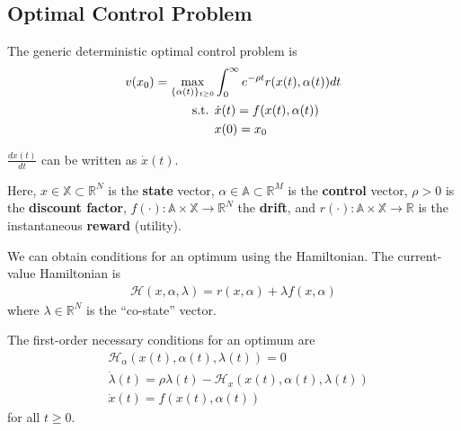 \documentclass[11pt]{elegantbook}
\begin{document}
\subsection{Optimal Control Problem}
\begin{definition}
    The generic deterministic optimal control problem is
    \begin{equation}
        \begin{aligned}
            v(x_0)=\max_{\{\alpha(t)\}_{t\geq 0}}&\int_0^\infty e^{-\rho t}r(x(t),\alpha(t))dt\\
            \textnormal{s.t. }&\dot{x}(t)=f(x(t),\alpha(t))\\
            &x(0)=x_0
        \end{aligned}
        \nonumber
    \end{equation}
    \begin{note}
        $\frac{dx(t)}{dt}$ can be written as $\dot{x}(t)$.
    \end{note}
    Here, $x\in\mathbb{X}\subset \mathbb{R}^N$ is the \textbf{state} vector, $\alpha\in \mathbb{A}\subset \mathbb{R}^M$ is the \textbf{control} vector, $\rho>0$ is the \textbf{discount factor}, $f(\cdot):\mathbb{A}\times \mathbb{X} \rightarrow \mathbb{R}^N$ the \textbf{drift}, and $r(\cdot):\mathbb{A}\times \mathbb{X} \rightarrow \mathbb{R}$ is the instantaneous \textbf{reward} (utility).
\end{definition}
We can obtain conditions for an optimum using the Hamiltonian.
The current-value Hamiltonian is
    \begin{equation}
        \begin{aligned}
            \mathcal{H}(x,\alpha,\lambda)=r(x,\alpha)+\lambda f(x,\alpha)
        \end{aligned}
        \nonumber
    \end{equation}
where $\lambda\in \mathbb{R}^N$ is the ``co-state'' vector.
\begin{proposition}
    The first-order necessary conditions for an optimum are
    \begin{equation}
        \begin{aligned}
            &\mathcal{H}_\alpha(x(t),\alpha(t),\lambda(t))=0\\
            &\dot{\lambda}(t)=\rho\lambda(t)-\mathcal{H}_x(x(t),\alpha(t),\lambda(t))\\
            &\dot{x}(t)=f(x(t),\alpha(t))
        \end{aligned}
        \nonumber
    \end{equation}
    for all $t\geq 0$.
\end{proposition}
\end{document}
